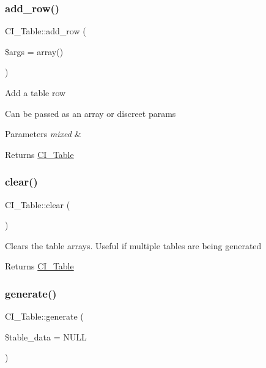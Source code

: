 \subsubsection{\texorpdfstring{add\+\_\+row()}{add\_row()}}
{\footnotesize\ttfamily C\+I\+\_\+\+Table\+::add\+\_\+row (\begin{DoxyParamCaption}\item[{}]{\$args = {\ttfamily array()} }\end{DoxyParamCaption})}

Add a table row

Can be passed as an array or discreet params


\begin{DoxyParams}{Parameters}
{\em mixed} & \\
\hline
\end{DoxyParams}
\begin{DoxyReturn}{Returns}
\mbox{\hyperlink{class_c_i___table}{C\+I\+\_\+\+Table}} 
\end{DoxyReturn}
\mbox{\label{class_c_i___table_af452779692cfae6de332f1f697170445}} 
\subsubsection{\texorpdfstring{clear()}{clear()}}
{\footnotesize\ttfamily C\+I\+\_\+\+Table\+::clear (\begin{DoxyParamCaption}{ }\end{DoxyParamCaption})}

Clears the table arrays. Useful if multiple tables are being generated

\begin{DoxyReturn}{Returns}
\mbox{\hyperlink{class_c_i___table}{C\+I\+\_\+\+Table}} 
\end{DoxyReturn}
\mbox{\label{class_c_i___table_af165170829d4e6622bc2322c56d21e00}} 
\subsubsection{\texorpdfstring{generate()}{generate()}}
{\footnotesize\ttfamily C\+I\+\_\+\+Table\+::generate (\begin{DoxyParamCaption}\item[{}]{\$table\+\_\+data = {\ttfamily NULL} }\end{DoxyParamCaption})}

